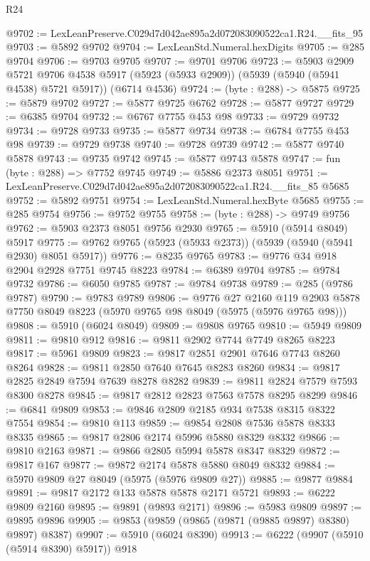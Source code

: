 \begin{lexlean}{R24}
\begin{coremodule}
@9702 := LexLeanPreserve.C029d7d042ae895a2d072083090522ca1.R24.__fits_95
@9703 := @5892 @9702
@9704 := LexLeanStd.Numeral.hexDigits
@9705 := @285 @9704
@9706 := @9703 @9705
@9707 := @9701 @9706
@9723 := @5903
    @2909
    @5721
    @9706
    @4538
    @5917
    (@5923 (@5933 @2909))
    (@5939 (@5940 (@5941 @4538) @5721 @5917))
    (@6714 @4536)
@9724 := (byte : @288) -> @5875
@9725 := @5879 @9702
@9727 := @5877 @9725 @6762
@9728 := @5877 @9727
@9729 := @6385 @9704
@9732 := @6767 @7755 @453 @98
@9733 := @9729 @9732
@9734 := @9728 @9733
@9735 := @5877 @9734
@9738 := @6784 @7755 @453 @98
@9739 := @9729 @9738
@9740 := @9728 @9739
@9742 := @5877 @9740 @5878
@9743 := @9735 @9742
@9745 := @5877 @9743 @5878
@9747 := fun (byte : @288) => @7752 @9745
@9749 := @5886 @2373 @8051
@9751 := LexLeanPreserve.C029d7d042ae895a2d072083090522ca1.R24.__fits_85 @5685
@9752 := @5892 @9751
@9754 := LexLeanStd.Numeral.hexByte @5685
@9755 := @285 @9754
@9756 := @9752 @9755
@9758 := (byte : @288) -> @9749 @9756
@9762 := @5903 @2373 @8051 @9756 @2930
@9765 := @5910 (@5914 @8049) @5917
@9775 := @9762 @9765 (@5923 (@5933 @2373)) (@5939 (@5940 (@5941 @2930) @8051 @5917))
@9776 := @8235 @9765
@9783 := @9776 @34 @918 @2904 @2928 @7751 @9745 @8223
@9784 := @6389 @9704
@9785 := @9784 @9732
@9786 := @6050 @9785
@9787 := @9784 @9738
@9789 := @285 (@9786 @9787)
@9790 := @9783 @9789
@9806 := @9776
    @27
    @2160
    @119
    @2903
    @5878
    @7750
    @8049
    @8223
    (@5970 @9765 @98 @8049 (@5975 (@5976 @9765 @98)))
@9808 := @5910 (@6024 @8049)
@9809 := @9808 @9765
@9810 := @5949 @9809
@9811 := @9810 @912
@9816 := @9811 @2902 @7744 @7749 @8265 @8223
@9817 := @5961 @9809
@9823 := @9817 @2851 @2901 @7646 @7743 @8260 @8264
@9828 := @9811 @2850 @7640 @7645 @8283 @8260
@9834 := @9817 @2825 @2849 @7594 @7639 @8278 @8282
@9839 := @9811 @2824 @7579 @7593 @8300 @8278
@9845 := @9817 @2812 @2823 @7563 @7578 @8295 @8299
@9846 := @6841 @9809
@9853 := @9846 @2809 @2185 @934 @7538 @8315 @8322 @7554
@9854 := @9810 @113
@9859 := @9854 @2808 @7536 @5878 @8333 @8335
@9865 := @9817 @2806 @2174 @5996 @5880 @8329 @8332
@9866 := @9810 @2163
@9871 := @9866 @2805 @5994 @5878 @8347 @8329
@9872 := @9817 @167
@9877 := @9872 @2174 @5878 @5880 @8049 @8332
@9884 := @5970 @9809 @27 @8049 (@5975 (@5976 @9809 @27))
@9885 := @9877 @9884
@9891 := @9817 @2172 @133 @5878 @5878 @2171 @5721
@9893 := @6222 @9809 @2160
@9895 := @9891 (@9893 @2171)
@9896 := @5983 @9809
@9897 := @9895 @9896
@9905 := @9853 (@9859 (@9865 (@9871 (@9885 @9897) @8380) @9897) @8387)
@9907 := @5910 (@6024 @8390)
@9913 := @6222 (@9907 (@5910 (@5914 @8390) @5917)) @918

\end{coremodule}
\end{lexlean}
